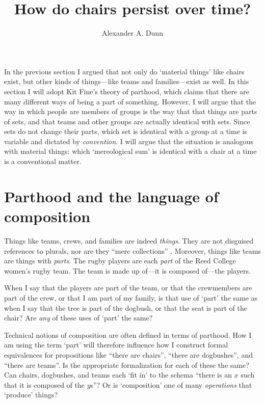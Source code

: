 \documentclass[11pt]{article}
\title{How do chairs persist over time?}
\author{Alexander A. Dunn}
\begin{document}
\ifstandalone
\maketitle
\begin{spacing}{1.5}
\fi

\label{parts}

In the previous section I argued that not only do `material things'
like chairs exist, but other kinds of things---like teams and
families---exist as well.  In this section I will adopt Kit Fine's
theory of parthood, which claims that there are many different ways of
being a part of something.  However, I will argue that the way in
which people are members of groups is the way that that things are
parts of sets, and that teams and other groups are actually identical
with sets.  Since sets do not change their parts, which set is
identical with a group at a time is variable and dictated by {\em
  convention}.  I will argue that the situation is analogous with
material things: which `mereological sum' is identical with a chair at
a time is a conventional matter.

\section{Parthood and the language of composition}
\label{parthood}
Things like teams, crews, and families are indeed {\em things}.  They
are not disguised references to plurals, nor are they ``mere
collections'' \citep[29]{inwagen2009}.  Moreover, things like teams
are things with {\em parts}.  The rugby players are each {\em part} of
the Reed College women's rugby team.  The team is made up of---it is
composed of---the players.

When I say that the players are part of the team, or that the
crewmembers are part of the crew, or that I am part of my family, is
that use of `part' the same as when I say that the tree is part of the
dogbush, or that the seat is part of the chair?  Are {\em any} of
these uses of `part' the same?

Technical notions of composition are often defined in terms of
parthood.  How I am using the term `part' will therefore influence how
I construct formal equivalences for propositions like ``there are
chairs'', ``there are dogbushes'', and ``there are teams''.  Is the
appropriate formalization for each of these the same?  Can chairs,
dogbushes, and teams each `fit in' to the schema ``there is an $x$
such that it is composed of the $y$s''?  Or is `composition' one of
many {\em operations} that `produce' things?


\end{spacing}
\end{document}
